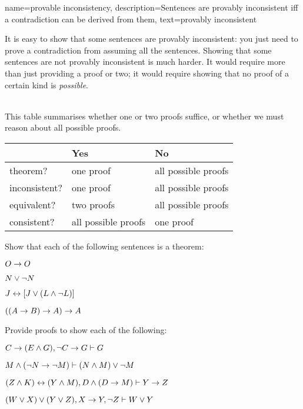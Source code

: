 {    name={provable inconsistency}, 
  description={Sentences are provably inconsistent iff a contradiction can be derived from them},
    text={provably inconsistent}
}

        It is easy to show that some sentences are provably inconsistent: you just need to prove a contradiction from assuming all the sentences. Showing that some sentences are not provably inconsistent is much harder. It would require more than just providing a proof or two; it would require showing that no proof of a certain kind is \emph{possible}.

\
\\
This table summarises whether one or two proofs suffice, or whether we must reason about all possible proofs.

\begin{center}
\begin{tabular}{l l l}
 & \textbf{Yes} & \textbf{No}\\
 \hline
theorem? & one proof & all possible proofs\\
inconsistent? &  one proof  & all possible proofs\\
equivalent? & two proofs & all possible proofs\\
consistent? & all possible proofs & one proof\\
\end{tabular}
\end{center}


\practiceproblems
\problempart
Show that each of the following sentences is a theorem:
\begin{earg}
\item $O \rightarrow O$
\item $N \vee \neg N$
\item $J \leftrightarrow [J\vee (L\wedge\neg L)]$
\item $((A \rightarrow B) \rightarrow A) \rightarrow A$ 
\end{earg}

\problempart
Provide proofs to show each of the following:
\begin{earg}
\item $C\rightarrow(E\wedge G), \neg C \rightarrow G \vdash G$
\item $M \wedge (\neg N \rightarrow \neg M) \vdash (N \wedge M) \vee \neg M$
\item $(Z\wedge K)\leftrightarrow(Y\wedge M), D\wedge(D\rightarrow M) \vdash Y\rightarrow Z$
\item $(W \vee X) \vee (Y \vee Z), X\rightarrow Y, \neg Z \vdash W\vee Y$
\end{earg}

